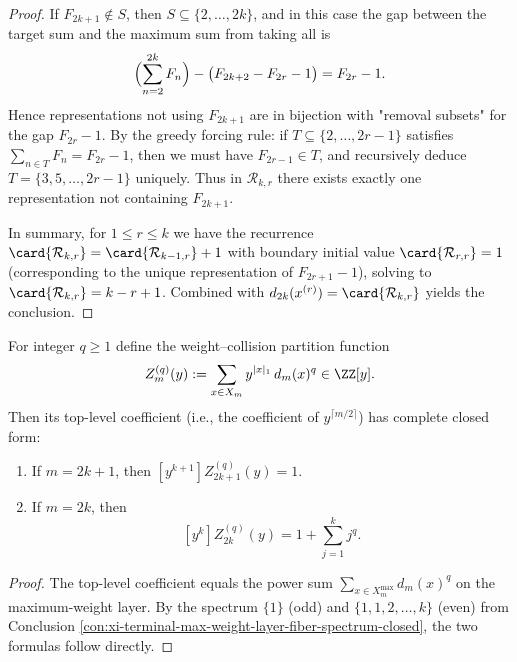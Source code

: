 \begin{proof}
\par
If \(F_{2k+1}\notin S\), then \(S\subseteq\{2,\dots,2k\}\), and in this case the gap between the target sum and the maximum sum from taking all is
\[
\Bigl(\sum_{n=2}^{2k}F_n\Bigr)-\bigl(F_{2k+2}-F_{2r}-1\bigr)=F_{2r}-1.
\]
Hence representations not using \(F_{2k+1}\) are in bijection with "removal subsets" for the gap \(F_{2r}-1\). By the greedy forcing rule:
if \(T\subseteq\{2,\dots,2r-1\}\) satisfies \(\sum_{n\in T}F_n=F_{2r}-1\), then we must have \(F_{2r-1}\in T\), and recursively deduce
\(
T=\{3,5,\dots,2r-1\}
\) uniquely.
Thus in \(\mathcal{R}_{k,r}\) there exists exactly one representation not containing \(F_{2k+1}\).
\par
In summary, for \(1\le r\le k\) we have the recurrence
\(
\card{\mathcal{R}_{k,r}}=\card{\mathcal{R}_{k-1,r}}+1
\)
with boundary initial value \(\card{\mathcal{R}_{r,r}}=1\) (corresponding to the unique representation of \(F_{2r+1}-1\)), solving to
\(
\card{\mathcal{R}_{k,r}}=k-r+1
\).
Combined with \(d_{2k}(x^{(r)})=\card{\mathcal{R}_{k,r}}\) yields the conclusion.
\end{proof}

\begin{conclusion}\label{con:xi-terminal-zq-top-coefficient-faulhaber}
For integer \(q\ge 1\) define the weight--collision partition function
\[
Z_m^{(q)}(y):=\sum_{x\in X_m}y^{|x|_1}\,d_m(x)^q\in\ZZ[y].
\]
Then its top-level coefficient (i.e., the coefficient of \(y^{\lceil m/2\rceil}\)) has complete closed form:
\begin{enumerate}
  \item If \(m=2k+1\), then \([y^{k+1}]Z_{2k+1}^{(q)}(y)=1\).
  \item If \(m=2k\), then
  \[
  [y^{k}]Z_{2k}^{(q)}(y)=1+\sum_{j=1}^{k}j^{q}.
  \]
\end{enumerate}
\end{conclusion}
\begin{proof}
The top-level coefficient equals the power sum \(\sum_{x\in X_m^{\max}}d_m(x)^q\) on the maximum-weight layer. By the spectrum \(\{1\}\) (odd) and \(\{1,1,2,\dots,k\}\) (even) from Conclusion \ref{con:xi-terminal-max-weight-layer-fiber-spectrum-closed}, the two formulas follow directly.
\end{proof}

